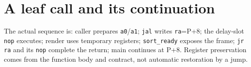 \section{A leaf call and its
  continuation}\label{009-sorting-visualizer-x-call-a-leaf-call-and-its-continuation}

The actual sequence is: caller prepares \texttt{a0}/\texttt{a1};
\texttt{jal} writes \texttt{ra}=P+8; the delay-slot \texttt{nop}
executes; render uses temporary registers; \texttt{sort\_ready} exposes
the frame; \texttt{jr} \texttt{ra} and its \texttt{nop} complete the
return; main continues at P+8. Register preservation comes from the
function body and contract, not automatic restoration by a jump.


